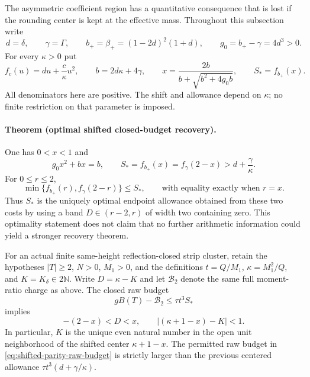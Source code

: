 The asymmetric coefficient region has a quantitative consequence that is lost
if the rounding center is kept at the effective mass.  Throughout this
subsection write
\[
 d=\delta,\qquad \gamma=\Gamma,\qquad
 b_+=\beta_+=(1-2d)^2(1+d),\qquad g_0=b_+-\gamma=4d^3>0.
\]
For every \(\kappa>0\) put
\[
 f_c(u)=du+\frac{c}{\kappa}u^2,\qquad
 b=2d\kappa+4\gamma,\qquad
 x=\frac{2b}{b+\sqrt{b^2+4g_0b}},\qquad S_*=f_{b_+}(x).
\]
All denominators here are positive.  The shift and allowance depend on
\(\kappa\); no finite restriction on that parameter is imposed.

\paragraph{Theorem (optimal shifted closed-budget recovery).}
One has \(0<x<1\) and
\begin{equation}
 g_0x^2+bx=b,\qquad
 S_*=f_{b_+}(x)=f_\gamma(2-x)
   >d+\frac{\gamma}{\kappa}.
 \label{eq:shifted-parity-matching}
\end{equation}
For \(0\le r\le2\),
\begin{equation}
 \min\{f_{b_+}(r),f_\gamma(2-r)\}\le S_*,
 \qquad\text{with equality exactly when }r=x.
 \label{eq:shifted-parity-optimum}
\end{equation}
Thus \(S_*\) is the uniquely optimal endpoint allowance obtained from these
two costs by using a band \(D\in(r-2,r)\) of width two containing zero.
This optimality statement does not claim that no further arithmetic
information could yield a stronger recovery theorem.

For an actual finite same-height reflection-closed strip cluster, retain the
hypotheses \(|T|\ge2\), \(N>0\), \(M_1>0\), and the definitions
\(t=Q/M_1\), \(\kappa=M_1^2/Q\), and
\(K=K_\delta\in2\mathbb N\).  Write
\(D=\kappa-K\) and let \(\mathcal B_2\) denote the same full moment-ratio
charge as above.  The closed raw budget
\begin{equation}
 gB(T)-\mathcal B_2\le \tau t^3 S_*
 \label{eq:shifted-parity-raw-budget}
\end{equation}
implies
\begin{equation}
 -(2-x)<D<x,\qquad
 \left|(\kappa+1-x)-K\right|<1.
 \label{eq:shifted-parity-recovered-order}
\end{equation}
In particular, \(K\) is the unique even natural number in the open unit
neighborhood of the shifted center \(\kappa+1-x\).  The permitted raw budget
in \eqref{eq:shifted-parity-raw-budget} is strictly larger than the previous
centered allowance \(\tau t^3(d+\gamma/\kappa)\).

